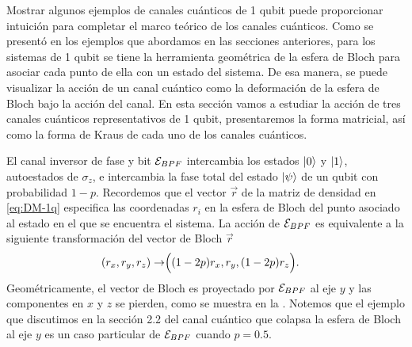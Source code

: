 Mostrar algunos ejemplos de canales cuánticos de 1 qubit 
puede proporcionar intuición 
para completar el marco teórico de los canales cuánticos. 
Como se presentó en los ejemplos que abordamos en las 
secciones anteriores, para los sistemas de 1 qubit se tiene la
herramienta geométrica de la esfera de Bloch para asociar cada 
punto de ella con un estado del sistema. De esa manera, 
se puede visualizar la acción de un canal cuántico como la 
deformación de la esfera de Bloch bajo la acción del canal.
En esta sección vamos a estudiar la acción de tres canales 
cuánticos representativos de 1 qubit, presentaremos
la forma matricial, así como la forma de Kraus de 
cada uno de los canales cuánticos.

El canal inversor de fase y bit $\mathcal{E}_{BPF}$ intercambia 
los estados $\ket{0}$ y $\ket{1}$, 
autoestados de $\sigma_z$, e intercambia la fase total
del estado $\ket{\psi}$ de un qubit con probabilidad $1-p$. 
Recordemos que el vector $\vec{r}$ de la matriz de densidad en \eqref{eq:DM-1q} 
especifica las coordenadas $r_i$ en la esfera de Bloch del punto asociado al estado
en el que se encuentra el sistema. La acción de $\mathcal{E}_{BPF}$ es 
equivalente a la siguiente transformación del vector de Bloch $\vec{r}$
\begin{align}
\qty(r_x,r_y,r_z)\rightarrow&\Big(\qty(1-2p)r_x,r_y,\qty(1-2p)r_z\Big).
\label{eq:bit-phase-flip-Bloch-trans}
\end{align}
Geométricamente, el vector de Bloch es proyectado por $\mathcal{E}_{BPF}$ 
al eje $y$ y las componentes en $x$ y $z$ se pierden, como 
se muestra en la .
Notemos que el ejemplo que discutimos en la sección 2.2 del 
canal cuántico que colapsa la esfera de Bloch al eje $y$ es un caso
particular de $\mathcal{E}_{BPF}$ cuando $p=0.5$.
